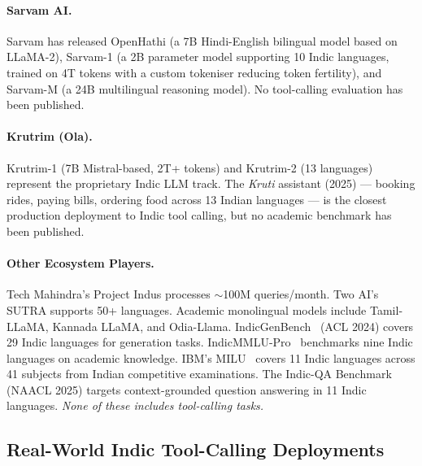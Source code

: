 \documentclass[11pt]{article}
\begin{document}
\paragraph{Sarvam AI.}
Sarvam has released OpenHathi (a 7B Hindi-English bilingual model based on LLaMA-2), Sarvam-1
\citep{sarvam12024} (a 2B parameter model supporting 10 Indic languages, trained on 4T tokens with
a custom tokeniser reducing token fertility), and Sarvam-M (a 24B multilingual reasoning model).
No tool-calling evaluation has been published.

\paragraph{Krutrim (Ola).}
Krutrim-1 (7B Mistral-based, 2T+ tokens) and Krutrim-2 (13 languages) represent the proprietary
Indic LLM track. The \textit{Kruti} assistant (2025) --- booking rides, paying bills, ordering
food across 13 Indian languages --- is the closest production deployment to Indic tool calling, but
no academic benchmark has been published.

\paragraph{Other Ecosystem Players.}
Tech Mahindra's Project Indus processes $\sim$100M queries/month. Two AI's SUTRA supports 50+
languages. Academic monolingual models include Tamil-LLaMA, Kannada LLaMA, and Odia-Llama.
IndicGenBench~\citep{indicgenbench2024} (ACL 2024) covers 29 Indic languages for generation tasks.
IndicMMLU-Pro~\citep{indicmmlupro2025} benchmarks nine Indic languages on academic knowledge.
IBM's MILU~\citep{milu2025} covers 11 Indic languages across 41 subjects from Indian competitive
examinations. The Indic-QA Benchmark~\citep{indicqa2025} (NAACL 2025) targets context-grounded
question answering in 11 Indic languages. \emph{None of these includes tool-calling tasks.}

\subsection{Real-World Indic Tool-Calling Deployments}
\end{document}
